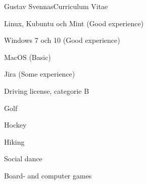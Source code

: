 \documentclass{article}
\begin{document}
\begin{cv}{Gustav Svennas}{Curriculum Vitae}
\cvseparator
\begin{cvitem}
    Linux, Kubuntu och Mint (Good experience)
\end{cvitem}

\cvseparator
\begin{cvitem}
    Windows 7 och 10 (Good experience)
\end{cvitem}

\cvseparator
\begin{cvitem}
    MacOS (Basic)
\end{cvitem}

\cvseparator
\begin{cvitem}
    Jira (Some experience)
\end{cvitem}

\cvseparator
\begin{cvitem}
    Driving license, categorie B
\end{cvitem}






\cvseparator
\begin{cvitem}
    Golf
\end{cvitem}

\cvseparator
\begin{cvitem}
    Hockey 
\end{cvitem}

\cvseparator
\begin{cvitem}
    Hiking
\end{cvitem}

\cvseparator
\begin{cvitem}
    Social dance
\end{cvitem}

\cvseparator
\begin{cvitem}
    Board- and computer games
\end{cvitem}


\end{cv}
\end{document}
